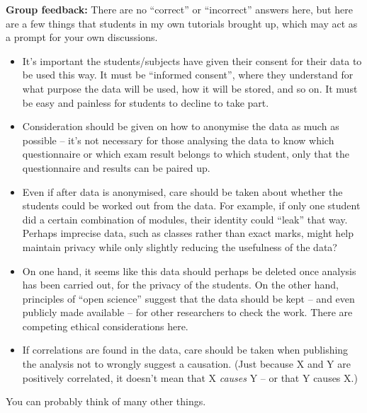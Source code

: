 \documentclass[
  a4paper,
]{book}
\theoremstyle{definition}
\theoremstyle{definition}
\theoremstyle{definition}
\theoremstyle{definition}
\theoremstyle{remark}
\begin{document}
\begin{myanswers}
\textbf{Group feedback:} There are no ``correct'' or ``incorrect'' answers here, but here are a few things that students in my own tutorials brought up, which may act as a prompt for your own discussions.

\begin{itemize}
\item
  It's important the students/subjects have given their consent for their data to be used this way. It must be ``informed consent'', where they understand for what purpose the data will be used, how it will be stored, and so on. It must be easy and painless for students to decline to take part.
\item
  Consideration should be given on how to anonymise the data as much as possible -- it's not necessary for those analysing the data to know which questionnaire or which exam result belongs to which student, only that the questionnaire and results can be paired up.
\item
  Even if after data is anonymised, care should be taken about whether the students could be worked out from the data. For example, if only one student did a certain combination of modules, their identity could ``leak'' that way. Perhaps imprecise data, such as classes rather than exact marks, might help maintain privacy while only slightly reducing the usefulness of the data?
\item
  On one hand, it seems like this data should perhaps be deleted once analysis has been carried out, for the privacy of the students. On the other hand, principles of ``open science'' suggest that the data should be kept -- and even publicly made available -- for other researchers to check the work. There are competing ethical considerations here.
\item
  If correlations are found in the data, care should be taken when publishing the analysis not to wrongly suggest a causation. (Just because X and Y are positively correlated, it doesn't mean that X \emph{causes} Y -- or that Y causes X.)
\end{itemize}

You can probably think of many other things.

\end{myanswers}
\end{document}
